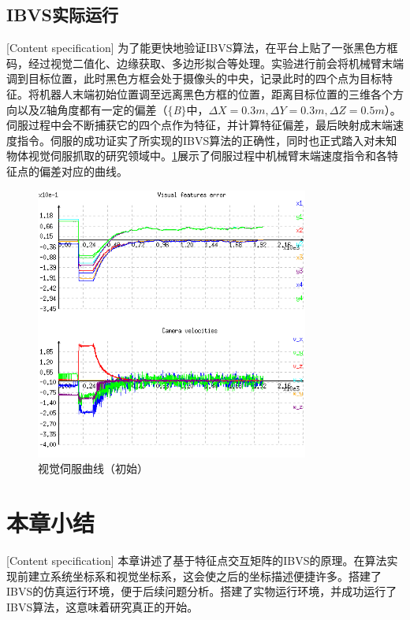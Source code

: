 \documentclass[fontset=fandol,type=bachelor,campus=harbin,bsmainpagenumberline=true]{hithesisbook}
\begin{document}
\subsection{IBVS实际运行}[Content specification]
为了能更快地验证IBVS算法，在平台上贴了一张黑色方框码，经过视觉二值化、边缘获取、多边形拟合等处理。实验进行前会将机械臂末端调到目标位置，此时黑色方框会处于摄像头的中央，记录此时的四个点为目标特征。将机器人末端初始位置调至远离黑色方框的位置，距离目标位置的三维各个方向以及Z轴角度都有一定的偏差（$\lbrace$\textit{B}$\rbrace$中，$\varDelta X=0.3m,\varDelta Y=0.3m,\varDelta Z=0.5m$）。伺服过程中会不断捕获它的四个点作为特征，并计算特征偏差，最后映射成末端速度指令。伺服的成功证实了所实现的IBVS算法的正确性，同时也正式踏入对未知物体视觉伺服抓取的研究领域中。\ref{视觉伺服曲线绘制（初始）}展示了伺服过程中机械臂末端速度指令和各特征点的偏差对应的曲线。
\begin{figure}[h]
\centering
\includegraphics[width = 0.8\textwidth]{chapter2/视觉伺服曲线绘制（初始）}
\caption{视觉伺服曲线（初始）}
\label{视觉伺服曲线绘制（初始）}
\end{figure}
\newpage
\section{本章小结}[Content specification]
本章讲述了基于特征点交互矩阵的IBVS的原理。在算法实现前建立系统坐标系和视觉坐标系，这会使之后的坐标描述便捷许多。搭建了IBVS的仿真运行环境，便于后续问题分析。搭建了实物运行环境，并成功运行了IBVS算法，这意味着研究真正的开始。
\end{document}
